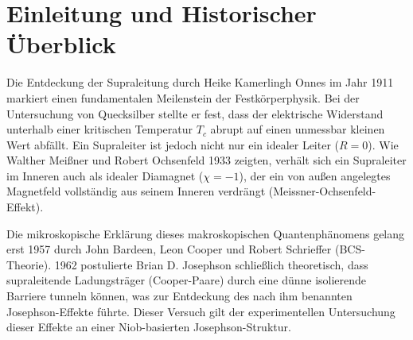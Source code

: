 \section{Einleitung und Historischer Überblick}
Die Entdeckung der Supraleitung durch Heike Kamerlingh Onnes im Jahr 1911 markiert einen fundamentalen Meilenstein der Festkörperphysik. Bei der Untersuchung von Quecksilber stellte er fest, dass der elektrische Widerstand unterhalb einer kritischen Temperatur $T_c$ abrupt auf einen unmessbar kleinen Wert abfällt. Ein Supraleiter ist jedoch nicht nur ein idealer Leiter ($R = 0$). Wie Walther Meißner und Robert Ochsenfeld 1933 zeigten, verhält sich ein Supraleiter im Inneren auch als idealer Diamagnet ($\chi = -1$), der ein von außen angelegtes Magnetfeld vollständig aus seinem Inneren verdrängt (Meissner-Ochsenfeld-Effekt). 

Die mikroskopische Erklärung dieses makroskopischen Quantenphänomens gelang erst 1957 durch John Bardeen, Leon Cooper und Robert Schrieffer (BCS-Theorie). 1962 postulierte Brian D. Josephson schließlich theoretisch, dass supraleitende Ladungsträger (Cooper-Paare) durch eine dünne isolierende Barriere tunneln können, was zur Entdeckung des nach ihm benannten Josephson-Effekte führte. Dieser Versuch gilt der experimentellen Untersuchung dieser Effekte an einer Niob-basierten Josephson-Struktur.
